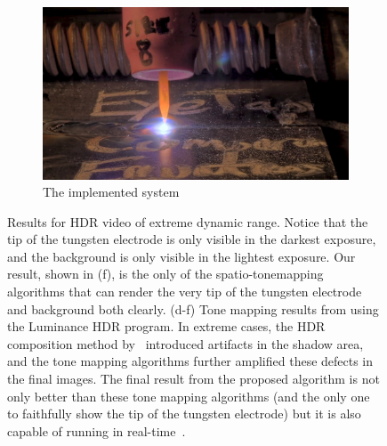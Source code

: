 \begin{figure}
\begin{subfigure}[b]{6.2in}
\centering
  \includegraphics[width=6.0in]{ch2/diagrams/frames/5stops/final_tm_result.jpg}
  \caption{The implemented system~\cite{lo2012high}}
  \label{fig:proposed_result}
\end{subfigure}
\caption{Results for HDR video of extreme dynamic range.
                 Notice that the tip of the tungsten electrode is only visible
                 in the darkest exposure, and the background is only visible
                 in the lightest exposure.
                 Our result, shown in (f), is the only of the spatio-tonemapping
                 algorithms that can render the very tip of the tungsten
                 electrode and background both clearly.
                 (d-f) Tone mapping results from 
\cite{mantiuk2006perceptual,fattal2002gradient,reinhard2002photographic} using the Luminance 
HDR program.
                 In extreme cases, the HDR composition method by~\cite{debevec2008recovering} 
introduced artifacts in the shadow area, and the tone mapping algorithms further amplified these 
defects in the final images.
                The final result from the proposed algorithm is not only better than these tone mapping algorithms (and the only one to 
faithfully show the tip of the tungsten electrode)
                but it is also capable of running in real-time~\cite{lo2012high}.}\label{fig:welding_results}
\end{figure}



